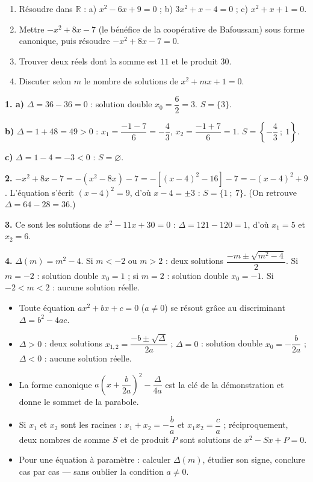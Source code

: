 \documentclass[11pt]{article}
\newcommand{\cle}[1]{{\popxbold\color{popdark}#1}}
\begin{document}
\begin{exercice}
\begin{enumerate}
\item Résoudre dans $\mathbb{R}$ : a) $x^2-6x+9=0$ ; b) $3x^2+x-4=0$ ; c) $x^2+x+1=0$.
\item Mettre $-x^2+8x-7$ (le bénéfice de la coopérative de Bafoussam) sous forme canonique, puis résoudre $-x^2+8x-7=0$.
\item Trouver deux réels dont la somme est $11$ et le produit $30$.
\item Discuter selon $m$ le nombre de solutions de $x^2+mx+1=0$.
\end{enumerate}
\end{exercice}

\begin{corrige}[Exercice 1]
\textbf{1. a)} $\Delta=36-36=0$ : solution double $x_0=\dfrac{6}{2}=3$. $S=\{3\}$.

\textbf{b)} $\Delta=1+48=49>0$ : $x_1=\dfrac{-1-7}{6}=-\dfrac{4}{3}$, $x_2=\dfrac{-1+7}{6}=1$. $S=\left\{-\dfrac{4}{3}\ ;\ 1\right\}$.

\textbf{c)} $\Delta=1-4=-3<0$ : $S=\varnothing$.

\textbf{2.} $-x^2+8x-7=-\left(x^2-8x\right)-7=-\left[(x-4)^2-16\right]-7=-(x-4)^2+9$. L'équation s'écrit $(x-4)^2=9$, d'où $x-4=\pm 3$ : $S=\{1\ ;\ 7\}$. (On retrouve $\Delta=64-28=36$.)

\textbf{3.} Ce sont les solutions de $x^2-11x+30=0$ : $\Delta=121-120=1$, d'où $x_1=5$ et $x_2=6$.

\textbf{4.} $\Delta(m)=m^2-4$. Si $m<-2$ ou $m>2$ : deux solutions $\dfrac{-m\pm\sqrt{m^2-4}}{2}$. Si $m=-2$ : solution double $x_0=1$ ; si $m=2$ : solution double $x_0=-1$. Si $-2<m<2$ : aucune solution réelle.
\end{corrige}

\begin{aretenir}
\begin{itemize}
\item Toute équation $ax^2+bx+c=0$ ($a\neq 0$) se résout grâce au \cle{discriminant} $\Delta=b^2-4ac$.
\item $\Delta>0$ : deux solutions $x_{1,2}=\dfrac{-b\pm\sqrt{\Delta}}{2a}$ ; $\Delta=0$ : solution double $x_0=-\dfrac{b}{2a}$ ; $\Delta<0$ : aucune solution réelle.
\item La \cle{forme canonique} $a\left(x+\dfrac{b}{2a}\right)^2-\dfrac{\Delta}{4a}$ est la clé de la démonstration et donne le sommet de la parabole.
\item Si $x_1$ et $x_2$ sont les racines : $x_1+x_2=-\dfrac{b}{a}$ et $x_1x_2=\dfrac{c}{a}$ ; réciproquement, deux nombres de somme $S$ et de produit $P$ sont solutions de $x^2-Sx+P=0$.
\item Pour une équation à paramètre : calculer $\Delta(m)$, étudier son signe, conclure cas par cas — sans oublier la condition $a\neq 0$.
\end{itemize}
\end{aretenir}
\end{document}
